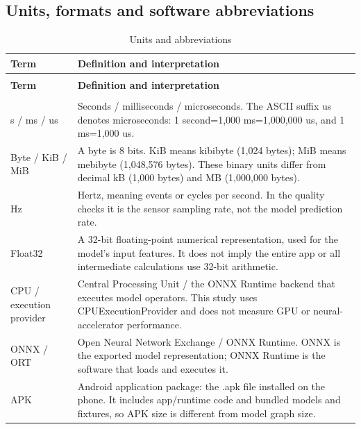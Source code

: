 \documentclass[10pt,a4paper]{article}
\begin{document}
\subsection{Units, formats and software abbreviations}
\begingroup\small\setlength{\tabcolsep}{4pt}\renewcommand{\arraystretch}{1.12}
\begin{longtable}{@{}>{\raggedright\arraybackslash}p{}>{\raggedright\arraybackslash}p{}@{}}
\caption{Units and abbreviations}\\
\toprule
\textbf{Term} & \textbf{Definition and interpretation} \\
\midrule\endfirsthead
\multicolumn{2}{l}{\small\itshape Continued from previous page}\\
\toprule
\textbf{Term} & \textbf{Definition and interpretation} \\
\midrule\endhead
\midrule\multicolumn{2}{r}{\small Continued on next page}\\\endfoot
\bottomrule\endlastfoot
s /\allowbreak{} ms /\allowbreak{} us & Seconds /\allowbreak{} milliseconds /\allowbreak{} microseconds. The ASCII suffix us denotes microseconds:\allowbreak{} 1 second=1,000 ms=1,000,000 us, and 1 ms=1,000 us. \\
Byte /\allowbreak{} KiB /\allowbreak{} MiB & A byte is 8 bits. KiB means kibibyte (1,024 bytes); MiB means mebibyte (1,048,576 bytes). These binary units differ from decimal kB (1,000 bytes) and MB (1,000,000 bytes). \\
Hz & Hertz, meaning events or cycles per second. In the quality checks it is the sensor sampling rate, not the model prediction rate. \\
Float32 & A 32-bit floating-point numerical representation, used for the model's input features. It does not imply the entire app or all intermediate calculations use 32-bit arithmetic. \\
CPU /\allowbreak{} execution provider & Central Processing Unit /\allowbreak{} the ONNX Runtime backend that executes model operators. This study uses CPUExecutionProvider and does not measure GPU or neural-accelerator performance. \\
ONNX /\allowbreak{} ORT & Open Neural Network Exchange /\allowbreak{} ONNX Runtime. ONNX is the exported model representation; ONNX Runtime is the software that loads and executes it. \\
APK & Android application package:\allowbreak{} the .apk file installed on the phone. It includes app/\allowbreak{}runtime code and bundled models and fixtures, so APK size is different from model graph size. \\

\end{longtable}
\end{document}
